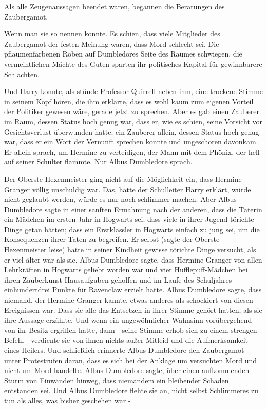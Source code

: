 {Als alle Zeugenaussagen beendet waren, begannen die Beratungen des Zaubergamot.

Wenn man sie so nennen konnte. Es schien, dass viele Mitglieder des Zaubergamot der festen Meinung waren, dass Mord schlecht sei. Die pflaumenfarbenen Roben auf Dumbledores Seite des Raumes schwiegen, die vermeintlichen Mächte des Guten sparten ihr politisches Kapital für gewinnbarere Schlachten.

Und Harry konnte, als stünde Professor Quirrell neben ihm, eine trockene Stimme in seinem Kopf hören, die ihm erklärte, dass es wohl kaum zum eigenen Vorteil der Politiker gewesen wäre, gerade jetzt zu sprechen. Aber es gab einen Zauberer im Raum, dessen Status hoch genug war, dass er, wie es schien, seine Vorsicht vor Gesichtsverlust überwunden hatte; ein Zauberer allein, dessen Status hoch genug war, dass er ein Wort der Vernunft sprechen konnte und ungeschoren davonkam. Er allein sprach, um Hermine zu verteidigen, der Mann mit dem Phönix, der hell auf seiner Schulter flammte. Nur Albus Dumbledore sprach.

Der Oberste Hexenmeister ging nicht auf die Möglichkeit ein, dass Hermine Granger völlig unschuldig war. Das, hatte der Schulleiter Harry erklärt, würde nicht geglaubt werden, würde es nur noch schlimmer machen. Aber Albus Dumbledore sagte in einer sanften Ermahnung nach der anderen, dass die Täterin ein Mädchen im ersten Jahr in Hogwarts sei; dass viele in ihrer Jugend törichte Dinge getan hätten; dass ein Erstklässler in Hogwarts einfach zu jung sei, um die Konsequenzen ihrer Taten zu begreifen. Er selbst (sagte der Oberste Hexenmeister leise) hatte in seiner Kindheit gewisse törichte Dinge versucht, als er viel älter war als sie. Albus Dumbledore sagte, dass Hermine Granger von allen Lehrkräften in Hogwarts geliebt worden war und vier Hufflepuff-Mädchen bei ihren Zauberkunst-Hausaufgaben geholfen und im Laufe des Schuljahres einhundertdrei Punkte für Ravenclaw erzielt hatte. Albus Dumbledore sagte, dass niemand, der Hermine Granger kannte, etwas anderes als schockiert von diesen Ereignissen war. Dass sie alle das Entsetzen in ihrer Stimme gehört hatten, als sie ihre Aussage erzählte. Und wenn ein ungewöhnlicher Wahnsinn vorübergehend von ihr Besitz ergriffen hatte, dann - seine Stimme erhob sich zu einem strengen Befehl - verdiente sie von ihnen nichts außer Mitleid und die Aufmerksamkeit eines Heilers. Und schließlich erinnerte Albus Dumbledore den Zaubergamot unter Protestrufen daran, dass es sich bei der Anklage um versuchten Mord und nicht um Mord handelte. Albus Dumbledore sagte, über einen aufkommenden Sturm von Einwänden hinweg, dass niemandem ein bleibender Schaden entstanden sei. Und Albus Dumbledore flehte sie an, nicht selbst Schlimmeres zu tun als alles, was bisher geschehen war -

}
